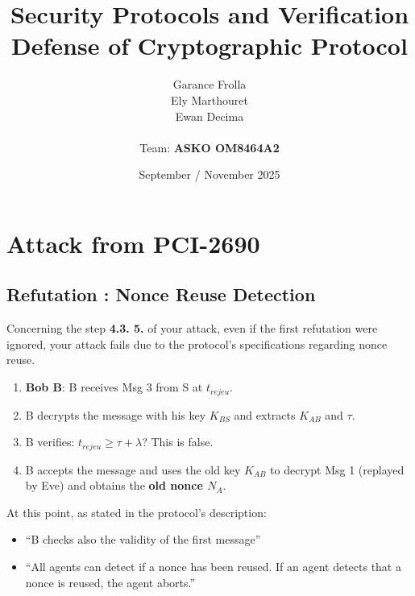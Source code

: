 \documentclass[11pt]{article}
\begin{document}
    \title{
        { \textbf{Security Protocols and Verification}} \\[1ex]
        {\small Defense of Cryptographic Protocol}
    }


    \author{
        Garance Frolla \\
        Ely Marthouret \\
        Ewan Decima\\ \\
        Team: \textbf{ASKO OM8464A2}
    }

    \date{September / November 2025}


    \maketitle
    \tableofcontents
    \newpage

    \section{Attack from PCI-2690}
    
    \subsection{Refutation : Nonce Reuse Detection}

    Concerning the step \textbf{4.3. 5.} of your attack, even if the first refutation were ignored, your attack fails due to the protocol's specifications regarding nonce reuse.
    
    \begin{enumerate}[label=\arabic*., start=5]
        \item \textbf{Bob B}: B receives Msg 3 from S at $t_{rejeu}$.
        \item B decrypts the message with his key $K_{BS}$ and extracts $K_{AB}$ and $\tau$.
        \item B verifies: $t_{rejeu} \geq \tau + \lambda$? This is false.
        \item B accepts the message and uses the old key $K_{AB}$ to decrypt Msg 1 (replayed by Eve) and obtains the \textbf{old nonce $N_A$}.
    \end{enumerate}

    At this point, as stated in the protocol's description:
    \begin{itemize}
        \item \enquote{B checks also the validity of the first message}
        \item \enquote{All agents can detect if a nonce has been reused. If an agent detects that a nonce is reused, the agent aborts.}
    \end{itemize}
    
\end{document}
